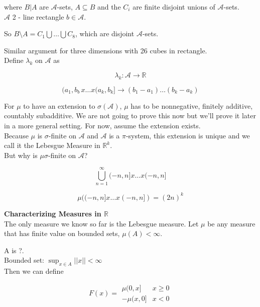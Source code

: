 \documentclass[11pt,fleqn]{book} %
\begin{document}
where $B|A$ are $\mathcal{A}$-sets, $A \subseteq B$ and the $C_i$ are finite disjoint unions of $\mathcal{A}$-sets.\\

$\mathcal{A}$ 2 - line rectangle $b \in \mathcal{A}$.


So $B \setminus A = C_1 \bigcup \dots \bigcup C_8$, which are disjoint $\mathcal{A}$-sets.

Similar argument for three dimensions with 26 cubes in rectangle. \\

Define $\lambda_k$ on $\mathcal{A}$ as 

		$$\lambda_k: \mathcal{A} \rightarrow \mathbb{R} $$

		$$(a_1, b_b\, x \dots x (a_k, b_k] \rightarrow (b_1 - a_1) \dots (b_k-a_k)$$

For $\mu$ to have an extension to $\sigma(\mathcal{A})$, $\mu$ has to be nonnegative, finitely additive, countably subadditive. We are not going to prove this now but we'll prove it later in a more general setting. For now, assume the extension exists. \\

Because $\mu$ is $\sigma$-finite on $\mathcal{A}$ and $\mathcal{A}$ is a $\pi$-system, this extension is unique and we call it the Lebesgue Measure in $\mathbb{R}^k$.\\

But why is $\mu \sigma$-finite on $\mathcal{A}$?

		$$\bigcup^\infty_{n = 1} (-n, n] x \dots x (-n, n] $$

		$$\mu((-n, n] x \dots x (-n, n]) = (2n)^k$$

\textbf{Characterizing Measures in $\mathbb{R}$}\\

The only measure we know so far is the Lebesgue measure. Let $\mu$ be any measure that has finite value on bounded sets, $\mu(A) < \infty$. 

A is ?. \\

Bounded set: $\sup_{x \in A} ||x|| < \infty$\\

Then we can define


		$$F(x) = \begin{array}{ll}
			\mu(0, x] & x\geq 0\\
			-\mu(x, 0] & x < 0
		\end{array} $$
\end{document}
